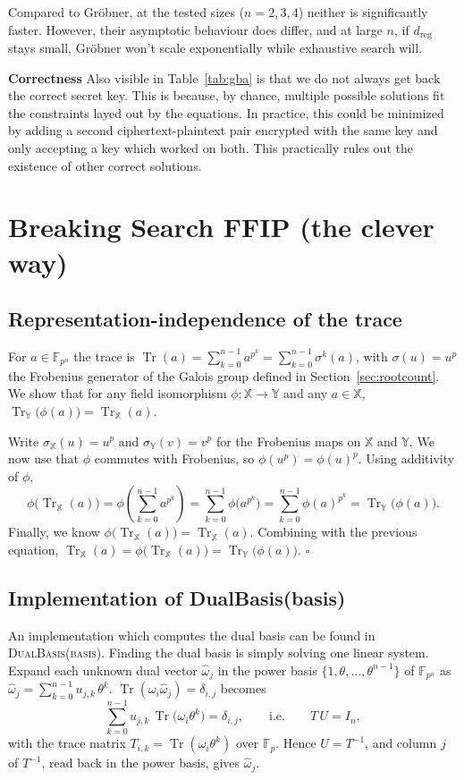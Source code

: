 \documentclass{article}
\DeclareMathOperator{\Tr}{Tr}
\begin{document}
Compared to Gröbner, at the tested sizes ($n=2,3,4$) neither is significantly faster. However, their asymptotic behaviour does differ, and at large $n$, if $d_{\mathrm{reg}}$ stays small, Gröbner won't scale exponentially while exhaustive search will.

\textbf{Correctness}
Also visible in Table~\ref{tab:gba} is that we do not always get back the correct secret key. This is because, by chance, multiple possible solutions fit the constraints layed out by the equations. In practice, this could be minimized by adding a second ciphertext-plaintext pair encrypted with the same key and only accepting a key which worked on both. This practically rules out the existence of other correct solutions.


\section{Breaking Search FFIP (the clever way)}
\subsection{Representation-independence of the trace}
\label{sec:traceinvariant}
For $a\in\mathbb{F}_{p^n}$ the trace is $\Tr(a)=\sum_{k=0}^{n-1}a^{p^k}=\sum_{k=0}^{n-1}\sigma^k(a)$, with $\sigma(u)=u^p$ the Frobenius generator of the Galois group defined in Section~\ref{sec:rootcount}. We show that for any field isomorphism $\phi:\mathbb{X}\to\mathbb{Y}$ and any $a\in\mathbb{X}$, $\Tr_{\mathbb{Y}}\bigl(\phi(a)\bigr)=\Tr_{\mathbb{X}}(a)$.

Write $\sigma_{\mathbb{X}}(u)=u^p$ and $\sigma_{\mathbb{Y}}(v)=v^p$ for the Frobenius maps on $\mathbb{X}$ and $\mathbb{Y}$. We now use that $\phi$ commutes with Frobenius, so $\phi(u^p) = \phi(u)^p$. Using additivity of $\phi$,
\[
    \phi\bigl(\Tr_{\mathbb{X}}(a)\bigr)=\phi\!\left(\sum_{k=0}^{n-1}a^{p^k}\right)=\sum_{k=0}^{n-1}\phi\bigl(a^{p^k}\bigr)=\sum_{k=0}^{n-1}\phi(a)^{p^k}=\Tr_{\mathbb{Y}}\bigl(\phi(a)\bigr).
\]
Finally, we know $\phi\bigl(\Tr_{\mathbb{X}}(a)\bigr)=\Tr_{\mathbb{X}}(a)$. Combining with the previous equation, \textbf{$\Tr_{\mathbb{X}}(a)=\phi\bigl(\Tr_{\mathbb{X}}(a)\bigr)=\Tr_{\mathbb{Y}}\bigl(\phi(a)\bigr)$}. $\square$

\subsection{Implementation of DualBasis(basis)}
\label{sec:dualbasis}
An implementation which computes the dual basis can be found in \textsc{DualBasis(basis)}. Finding the dual basis is simply solving one linear system. Expand each unknown dual vector $\hat\omega_j$ in the power basis $\{1,\theta,\dots,\theta^{n-1}\}$ of $\mathbb{F}_{p^n}$ as $\hat\omega_j=\sum_{k=0}^{n-1}u_{j,k}\,\theta^k$. $\Tr(\omega_i\hat\omega_j)=\delta_{i,j}$ becomes
\[
    \sum_{k=0}^{n-1} u_{j,k}\,\Tr\!\bigl(\omega_i\theta^k\bigr)=\delta_{i,j},
    \qquad\text{i.e.}\qquad T\,U=I_n,
\]
with the trace matrix $T_{i,k}=\Tr(\omega_i\theta^{k})$ over $\mathbb{F}_p$. Hence $U=T^{-1}$, and column $j$ of $T^{-1}$, read back in the power basis, gives $\hat\omega_j$.
\end{document}

